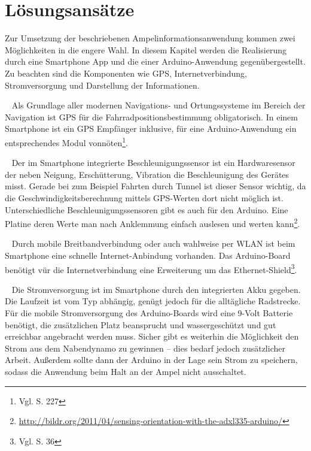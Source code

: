 \chapter{Lösungsansätze}
Zur Umsetzung der beschriebenen Ampelinformationsanwendung kommen zwei Möglichkeiten in die engere Wahl. In diesem Kapitel werden die Realisierung durch eine \gls{Smartphone} \Gls{App} und die einer \gls{Arduino}-Anwendung gegenübergestellt. Zu beachten sind die Komponenten wie \gls{GPS}, Internetverbindung, Stromversorgung und Darstellung der Informationen.\\
\begin{description}[leftmargin=0.7cm,style=nextline]
  \item[\gls{GPS}] ~ Als Grundlage aller modernen Navigations- und Ortungssysteme im Bereich der Navigation ist \gls{GPS} für die Fahrradpositionsbestimmung obligatorisch. In einem \gls{Smartphone} ist ein \gls{GPS} Empfänger inklusive, für eine \gls{Arduino}-Anwendung ein entsprechendes Modul vonnöten\footnote{ Vgl. \cite{arduino} S. 227}.\\
  \item[Beschleunigungssensor] ~ Der im \gls{Smartphone} integrierte Beschleunigungssensor ist ein Hardwaresensor der neben Neigung, Erschütterung, Vibration die Beschleunigung des Gerätes misst. Gerade bei zum Beispiel Fahrten durch Tunnel ist dieser Sensor wichtig, da die Geschwindigkeitsberechnung mittels \gls{GPS}-Werten dort nicht möglich ist. Unterschiedliche Beschleunigungssensoren gibt es auch für den \gls{Arduino}. Eine Platine deren Werte man nach Anklemmung einfach auslesen und werten kann\footnote{\url{http://bildr.org/2011/04/sensing-orientation-with-the-adxl335-arduino/}}.
\\
  \item[Internetverbindung] ~ Durch mobile Breitbandverbindung oder auch wahlweise per \gls{WLAN} ist beim \gls{Smartphone} eine schnelle Internet-Anbindung vorhanden. 
  Das \gls{Arduino}-Board benötigt vür die Internetverbindung eine Erweiterung um das Ethernet-Shield\footnote{ Vgl. \cite{arduino} S. 36}.\\
  \item[Stromversorgung] ~ Die Stromversorgung ist im \gls{Smartphone} durch den integrierten Akku gegeben. Die Laufzeit ist vom Typ abhängig, genügt jedoch für die alltägliche Radstrecke. Für die mobile Stromversorgung des \gls{Arduino}-Boards wird eine 9-Volt Batterie benötigt, die zusätzlichen Platz beansprucht und wassergeschützt und gut erreichbar angebracht werden muss. Sicher gibt es weiterhin die Möglichkeit den Strom aus dem Nabendynamo zu gewinnen -- dies bedarf jedoch zusätzlicher Arbeit. Außerdem sollte dann der \gls{Arduino} in der Lage sein Strom zu speichern, sodass die Anwendung beim Halt an der Ampel nicht ausschaltet.\\

\end{description}
